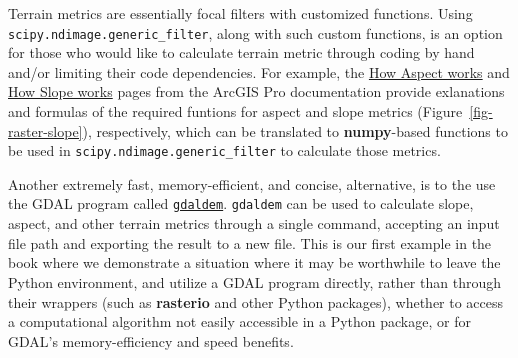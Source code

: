 \documentclass[
  letterpaper,
]{krantz}
\begin{document}
\begin{tcolorbox}[enhanced jigsaw, title=\textcolor{quarto-callout-note-color}{\faInfo}\hspace{0.5em}{Note}, coltitle=black, colbacktitle=quarto-callout-note-color!10!white, breakable, titlerule=0mm, colframe=quarto-callout-note-color-frame, opacitybacktitle=0.6, colback=white, bottomrule=.15mm, left=2mm, leftrule=.75mm, toprule=.15mm, toptitle=1mm, bottomtitle=1mm, arc=.35mm, opacityback=0, rightrule=.15mm]

Terrain metrics are essentially focal filters with customized functions.
Using \texttt{scipy.ndimage.generic\_filter}, along with such custom
functions, is an option for those who would like to calculate terrain
metric through coding by hand and/or limiting their code dependencies.
For example, the
\href{https://pro.arcgis.com/en/pro-app/latest/tool-reference/spatial-analyst/how-aspect-works.htm}{How
Aspect works} and
\href{https://pro.arcgis.com/en/pro-app/latest/tool-reference/spatial-analyst/how-slope-works.htm}{How
Slope works} pages from the ArcGIS Pro documentation provide exlanations
and formulas of the required funtions for aspect and slope metrics
(Figure~\ref{fig-raster-slope}), respectively, which can be translated
to \textbf{numpy}-based functions to be used in
\texttt{scipy.ndimage.generic\_filter} to calculate those metrics.

\end{tcolorbox}

Another extremely fast, memory-efficient, and concise, alternative, is
to the use the GDAL program called
\href{https://gdal.org/programs/gdaldem.html}{\texttt{gdaldem}}.
\texttt{gdaldem} can be used to calculate slope, aspect, and other
terrain metrics through a single command, accepting an input file path
and exporting the result to a new file. This is our first example in the
book where we demonstrate a situation where it may be worthwhile to
leave the Python environment, and utilize a GDAL program directly,
rather than through their wrappers (such as \textbf{rasterio} and other
Python packages), whether to access a computational algorithm not easily
accessible in a Python package, or for GDAL's memory-efficiency and
speed benefits.
\end{document}
